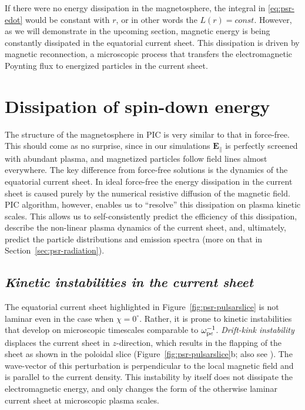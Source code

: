 If there were no energy dissipation in the magnetosphere, the integral in \eqref{eq:psr-edot} would be constant with $r$, or in other words the $L(r)=const$. However, as we will demonstrate in the upcoming section, magnetic energy is being constantly dissipated in the equatorial current sheet. This dissipation is driven by magnetic reconnection, a microscopic process that transfers the electromagnetic Poynting flux to energized particles in the current sheet.

\section{Dissipation of spin-down energy}
\label{sec:psr-dissipation}

The structure of the magnetosphere in PIC is very similar to that in force-free. This should come as no surprise, since in our simulations $\bm{E}_\parallel$ is perfectly screened with abundant plasma, and magnetized particles follow field lines almost everywhere. The key difference from force-free solutions is the dynamics of the equatorial current sheet. In ideal force-free the energy dissipation in the current sheet is caused purely by the numerical resistive diffusion of the magnetic field. PIC algorithm, however, enables us to ``resolve'' this dissipation on plasma kinetic scales. This allows us to self-consistently predict the efficiency of this dissipation, describe the non-linear plasma dynamics of the current sheet, and, ultimately, predict the particle distributions and emission spectra (more on that in Section~\ref{sec:psr-radiation}). 

\subsection*{\small\it Kinetic instabilities in the current sheet}

The equatorial current sheet highlighted in Figure~\ref{fig:psr-pulsarslice} is not laminar even in the case when $\chi=0^\circ$. Rather, it is prone to kinetic instabilities that develop on microscopic timescales comparable to $\omega_{{\rm p}e}^{-1}$. \emph{Drift-kink instability} displaces the current sheet in $z$-direction, which results in the flapping of the sheet as shown in the poloidal slice (Figure~\ref{fig:psr-pulsarslice}b; also see \citealt{2014ApJ...785L..33P, 2015MNRAS.448..606C}). The wave-vector of this perturbation is perpendicular to the local magnetic field and is parallel to the current density. This instability by itself does not dissipate the electromagnetic energy, and only changes the form of the otherwise laminar current sheet at microscopic plasma scales. 

